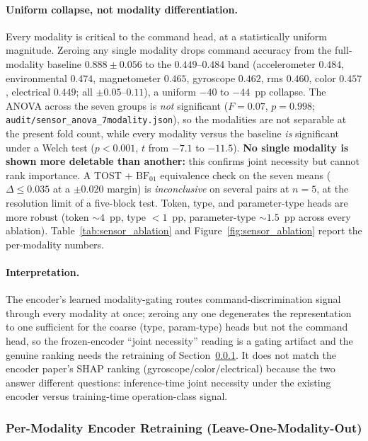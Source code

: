 \documentclass[sensors,article,submit,moreauthors,pdftex]{Definitions/mdpi}
\begin{document}
\paragraph{Uniform collapse, not modality differentiation.} Every modality is critical to the command head, at a statistically uniform magnitude. Zeroing any single modality drops command accuracy from the full-modality baseline $0.888 \pm 0.056$ to the $0.449$--$0.484$ band (accelerometer $0.484$, environmental $0.474$, magnetometer $0.465$, gyroscope $0.462$, rms $0.460$, color $0.457$, electrical $0.449$; all $\pm 0.05$--$0.11$), a uniform $-40$ to $-44$~pp collapse. The ANOVA across the seven groups is \emph{not} significant ($F=0.07$, $p=0.998$; \texttt{audit/sensor\_anova\_7modality.json}), so the modalities are not separable at the present fold count, while every modality versus the baseline \emph{is} significant under a Welch test ($p<0.001$, $t$ from $-7.1$ to $-11.5$). \textbf{No single modality is shown more deletable than another:} this confirms joint necessity but cannot rank importance. A TOST + $\mathrm{BF}_{01}$ equivalence check on the seven means ($\Delta\!\le\!0.035$ at a $\pm 0.020$ margin) is \emph{inconclusive} on several pairs at $n\!=\!5$, at the resolution limit of a five-block test. Token, type, and parameter-type heads are more robust (token $\sim 4$~pp, type $<1$~pp, parameter-type $\sim 1.5$~pp across every ablation). Table~\ref{tab:sensor_ablation} and Figure~\ref{fig:sensor_ablation} report the per-modality numbers.




\paragraph{Interpretation.} The encoder's learned modality-gating routes command-discrimination signal through every modality at once; zeroing any one degenerates the representation to one sufficient for the coarse (type, param-type) heads but not the command head, so the frozen-encoder ``joint necessity'' reading is a gating artifact and the genuine ranking needs the retraining of Section~\ref{sec:abl-lomo}. It does not match the encoder paper's SHAP ranking (gyroscope/color/electrical) because the two answer different questions: inference-time joint necessity under the existing encoder versus training-time operation-class signal.

\subsubsection{Per-Modality Encoder Retraining (Leave-One-Modality-Out)}
\label{sec:abl-lomo}
\end{document}
